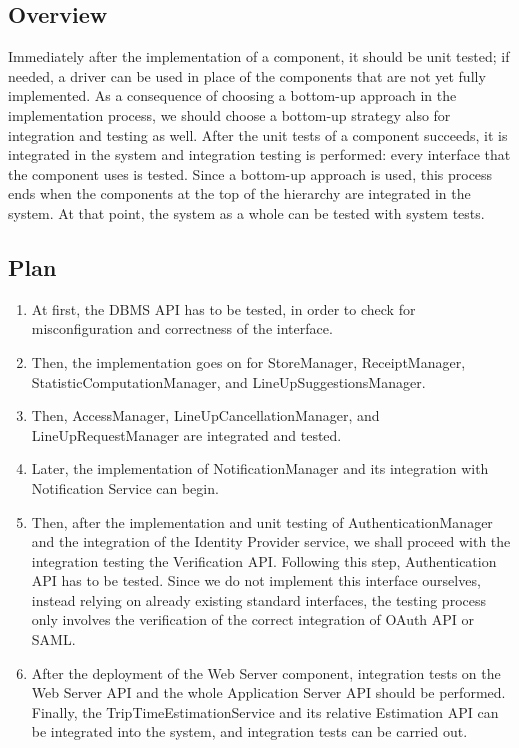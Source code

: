\documentclass[../../main.tex]{subfiles}
\begin{document}
\subsection{Overview}

Immediately after the implementation of a component, it should be unit tested; if needed, a driver can be used in place of the components that are not yet fully implemented. 
As a consequence of choosing a bottom-up approach in the implementation process, we should choose a bottom-up strategy also for integration and testing as well. 
After the unit tests of a component succeeds, it is integrated in the system and integration testing is performed: every interface that the component uses is tested. Since a bottom-up approach is used, this process ends when the components at the top of the hierarchy are integrated in the system.
At that point, the system as a whole can be tested with system tests.

\subsection{Plan}

\begin{enumerate}

	\item At first, the DBMS API has to be tested, in order to check for misconfiguration and correctness of the interface.

	\item Then, the implementation goes on for StoreManager, ReceiptManager, StatisticComputationManager, and LineUpSuggestionsManager. 
	
\item Then, AccessManager, LineUpCancellationManager, and LineUpRequestManager are integrated and tested.
	\item Later, the implementation of NotificationManager and its integration with Notification Service can begin. 

	\item Then, after the implementation and unit testing of AuthenticationManager and the integration of the Identity Provider service, we shall proceed with the integration testing the Verification API. 
	Following this step, Authentication API has to be tested. Since we do not implement this interface ourselves, instead relying on already existing standard interfaces, the testing process only involves the verification of the correct integration of OAuth API or SAML.

	\item After the deployment of the Web Server component, integration tests on the Web Server API and the whole Application Server API should be performed. 
	Finally, the TripTimeEstimationService and its relative Estimation API can be integrated into the system, and integration tests can be carried out. 

\end{enumerate}
\end{document}

